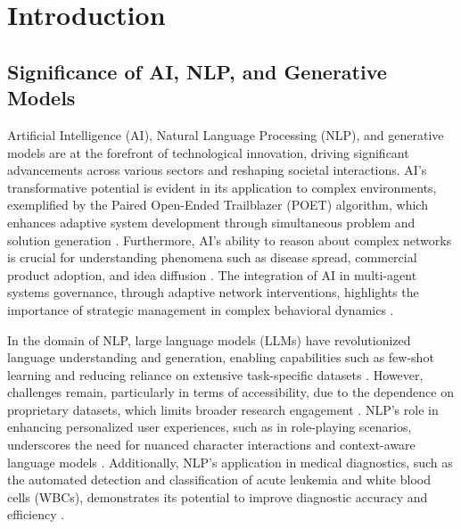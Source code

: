 \section{Introduction} \label{sec:Introduction}


\subsection{Significance of AI, NLP, and Generative Models} \label{subsec:Significance of AI, NLP, and Generative Models}



Artificial Intelligence (AI), Natural Language Processing (NLP), and generative models are at the forefront of technological innovation, driving significant advancements across various sectors and reshaping societal interactions. AI's transformative potential is evident in its application to complex environments, exemplified by the Paired Open-Ended Trailblazer (POET) algorithm, which enhances adaptive system development through simultaneous problem and solution generation \cite{wang2019pairedopenendedtrailblazerpoet}. Furthermore, AI's ability to reason about complex networks is crucial for understanding phenomena such as disease spread, commercial product adoption, and idea diffusion \cite{shakarian2022reasoningcomplexnetworkslogic}. The integration of AI in multi-agent systems governance, through adaptive network interventions, highlights the importance of strategic management in complex behavioral dynamics \cite{chen2024adaptivenetworkinterventioncomplex}.



In the domain of NLP, large language models (LLMs) have revolutionized language understanding and generation, enabling capabilities such as few-shot learning and reducing reliance on extensive task-specific datasets \cite{chowdhery2023palm}. However, challenges remain, particularly in terms of accessibility, due to the dependence on proprietary datasets, which limits broader research engagement \cite{touvron2023llama}. NLP's role in enhancing personalized user experiences, such as in role-playing scenarios, underscores the need for nuanced character interactions and context-aware language models \cite{tao2024rolecraftglmadvancingpersonalizedroleplaying}. Additionally, NLP's application in medical diagnostics, such as the automated detection and classification of acute leukemia and white blood cells (WBCs), demonstrates its potential to improve diagnostic accuracy and efficiency \cite{zolfaghari2023surveyautomateddetectionclassification}.



